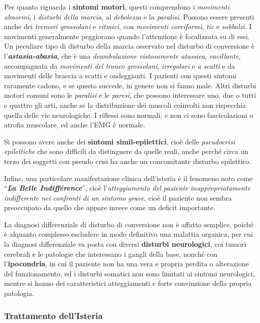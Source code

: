 Per quanto riguarda i \textbf{sintomi motori}, questi comprendono i
\emph{movimenti abnormi}, i \emph{disturbi della marcia}, al
\emph{debolezza} e la \emph{paralisi}. Possono essere presenti anche dei
\emph{tremori grossolani} e \emph{ritmici}, con \emph{movimenti
coreiformi}, \emph{tic} e \emph{sobbalzi}. I movimenti generalmente
peggiorano quando l'attenzione è focalizzata su di essi. Un peculiare
tipo di disturbo della marcia osservato nel disturbo di conversione è
l'\textbf{\emph{astasia-abasia}}, che è una \emph{deambulazione
vistosamente atassica}, \emph{vacillante}, accompagnata da
\emph{movimenti del tronco grossolani}, \emph{irregolari} e \emph{a
scatti} e da movimenti delle braccia a scatti e ondeggianti. I pazienti
con questi sintomi raramente cadono, e se questo succede, in genere non
si fanno male. Altri disturbi motori comuni sono le \emph{paralisi} e le
\emph{paresi}, che possono interessare uno, due o tutti e quattro gli
arti, anche se la distribuzione dei muscoli coinvolti non rispecchia
quella delle vie neurologiche. I riflessi sono normali, e non ci sono
fascicolazioni o atrofia muscolare, ed anche l'EMG è normale.

Si possono avere anche dei \textbf{sintomi simil-epilettici}, cioè delle
\emph{pseudocrisi epilettiche} che sono difficili da distinguere da
quelle reali, anche perché circa un terzo dei soggetti con pseudo crisi
ha anche un concomitante disturbo epilettico.

Infine, una particolare manifestazione clinica dell'isteria è il
fenomeno noto come ``\textbf{\emph{La Belle Indifférence}}'', cioè
l'\emph{atteggiamento del paziente inappropriatamente indifferente nei
confronti di un sintomo grave}, cioè il paziente non sembra preoccupato
da quello che appare invece come un deficit importante.

La diagnosi differenziale di disturbo di conversione non è affatto
semplice, poiché è alquanto complesso escludere in modo definitivo una
malattia organica, per cui la diagnosi differenziale va posta con
diversi \textbf{disturbi neurologici}, coi tumori cerebrali e le
patologie che interessano i gangli della base, nonché con
l'\textbf{ipocondria}, in cui il paziente non ha una vera e propria
perdita o alterazione del funzionamento, ed i disturbi somatici non sono
limitati ai sintomi neurologici, mentre si hanno dei caratteristici
atteggiamenti e forte convinzione della propria patologia.

\subsubsection{Trattamento dell'Isteria}

